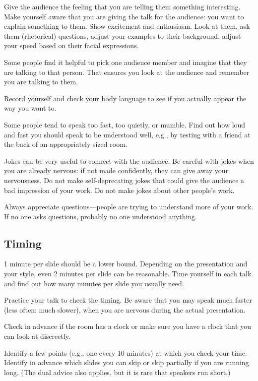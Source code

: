 \documentclass[12pt]{article}
\begin{document}
Give the audience the feeling that you are telling them something interesting.
Make yourself aware that you are giving the talk for the audience: you want to explain something to them.
Show excitement and enthusiasm.
Look at them, ask them (rhetorical) questions, adjust your examples to their background, adjust your speed based on their facial expressions.
\medskip

Some people find it helpful to pick one audience member and imagine that they are talking to that person.
That ensures you look at the audience and remember you are talking to them.
\medskip

Record yourself and check your body language to see if you actually appear the way you want to.
\medskip

Some people tend to speak too fast, too quietly, or mumble.
Find out how loud and fast you should speak to be understood well, e.g., by testing with a friend at the back of an appropriately sized room.
\medskip

Jokes can be very useful to connect with the audience.
Be careful with jokes when you are already nervous: if not made confidently, they can give away your nervousness.
Do not make self-deprecating jokes that could give the audience a bad impression of your work.
Do not make jokes about other people's work.
\medskip

Always appreciate questions---people are trying to understand more of your work.
If no one asks questions, probably no one understood anything.

\subsection{Timing}

1 minute per slide should be a lower bound.
Depending on the presentation and your style, even 2 minutes per slide can be reasonable.
Time yourself in each talk and find out how many minutes per slide you usually need.
\medskip

Practice your talk to check the timing.
Be aware that you may speak much faster (less often: much slower), when you are nervous during the actual presentation.
\medskip

Check in advance if the room has a clock or make sure you have a clock that you can look at discreetly.
\medskip

Identify a few points (e.g., one every 10 minutes) at which you check your time.
Identify in advance which slides you can skip or skip partially if you are running long.
(The dual advice also applies, but it is rare that speakers run short.)
\end{document}
